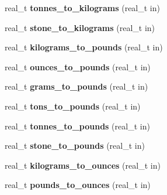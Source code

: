 \begin{DoxyCompactItemize}
\item 
\hypertarget{namespaceetk_aece52b83faf3796b71ef2e6dcda6e1ca}{real\-\_\-t {\bfseries tonnes\-\_\-to\-\_\-kilograms} (real\-\_\-t in)}\label{namespaceetk_aece52b83faf3796b71ef2e6dcda6e1ca}

\item 
\hypertarget{namespaceetk_a4aae47d2130c1f56b4b44fa3d62a0b72}{real\-\_\-t {\bfseries stone\-\_\-to\-\_\-kilograms} (real\-\_\-t in)}\label{namespaceetk_a4aae47d2130c1f56b4b44fa3d62a0b72}

\item 
\hypertarget{namespaceetk_ae5398b6ee1fe810cc250c24afff1d819}{real\-\_\-t {\bfseries kilograms\-\_\-to\-\_\-pounds} (real\-\_\-t in)}\label{namespaceetk_ae5398b6ee1fe810cc250c24afff1d819}

\item 
\hypertarget{namespaceetk_aa4b7b39b530e8e8e1fd7f7104bdd56d4}{real\-\_\-t {\bfseries ounces\-\_\-to\-\_\-pounds} (real\-\_\-t in)}\label{namespaceetk_aa4b7b39b530e8e8e1fd7f7104bdd56d4}

\item 
\hypertarget{namespaceetk_a2bf56ff369f6fb9cc4ce1d1f464887f7}{real\-\_\-t {\bfseries grams\-\_\-to\-\_\-pounds} (real\-\_\-t in)}\label{namespaceetk_a2bf56ff369f6fb9cc4ce1d1f464887f7}

\item 
\hypertarget{namespaceetk_a477f03ba9910cc954f0abe719d653c78}{real\-\_\-t {\bfseries tons\-\_\-to\-\_\-pounds} (real\-\_\-t in)}\label{namespaceetk_a477f03ba9910cc954f0abe719d653c78}

\item 
\hypertarget{namespaceetk_a7689548075e7697970d867c2bafe3486}{real\-\_\-t {\bfseries tonnes\-\_\-to\-\_\-pounds} (real\-\_\-t in)}\label{namespaceetk_a7689548075e7697970d867c2bafe3486}

\item 
\hypertarget{namespaceetk_a58cdf9fb31dc6de93af01ef15c85b31f}{real\-\_\-t {\bfseries stone\-\_\-to\-\_\-pounds} (real\-\_\-t in)}\label{namespaceetk_a58cdf9fb31dc6de93af01ef15c85b31f}

\item 
\hypertarget{namespaceetk_ac2835971767c1cb5c013d36acbc5013d}{real\-\_\-t {\bfseries kilograms\-\_\-to\-\_\-ounces} (real\-\_\-t in)}\label{namespaceetk_ac2835971767c1cb5c013d36acbc5013d}

\item 
\hypertarget{namespaceetk_ace77e4b765a8b4e602dea455f76afe37}{real\-\_\-t {\bfseries pounds\-\_\-to\-\_\-ounces} (real\-\_\-t in)}\label{namespaceetk_ace77e4b765a8b4e602dea455f76afe37}


\end{DoxyCompactItemize}
